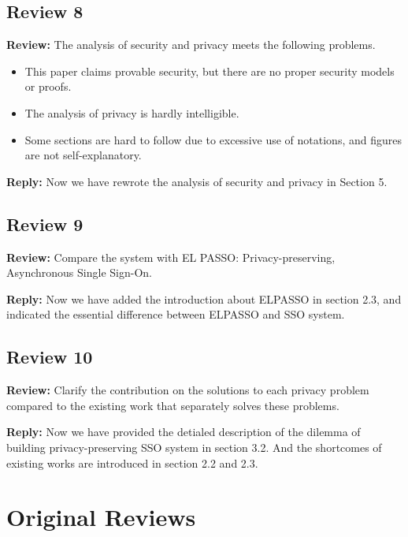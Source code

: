 \documentclass[letterpaper,onecolumn,10pt]{article}
\begin{document}
\subsection*{Review 8}
\vspace{1mm}\noindent\textbf{Review:}
The analysis of security and privacy meets the following problems.
\begin{itemize}
 \item This paper claims provable security, but there are no proper security models or proofs.
 \item The analysis of privacy is hardly intelligible.
 \item Some sections are hard to follow due to excessive use of notations, and figures are not self-explanatory.
\end{itemize}

\vspace{1mm}\noindent\textbf{Reply:}
Now we have rewrote the analysis of security and privacy in Section 5.

\subsection*{Review 9}
\vspace{1mm}\noindent\textbf{Review:}
Compare the system with EL PASSO: Privacy-preserving, Asynchronous Single Sign-On.

\vspace{1mm}\noindent\textbf{Reply:}
Now we have added the introduction about ELPASSO in section 2.3, and indicated the essential difference between ELPASSO and SSO system.


\subsection*{Review 10}
\vspace{1mm}\noindent\textbf{Review:}
Clarify the contribution on the solutions to each privacy problem compared to the existing work that separately solves these problems.

\vspace{1mm}\noindent\textbf{Reply:}
Now we have provided the detialed description of the dilemma of building privacy-preserving SSO system in section 3.2. And the shortcomes of existing works are introduced in section 2.2 and 2.3.


\newpage
\section*{Original Reviews}
\end{document}
